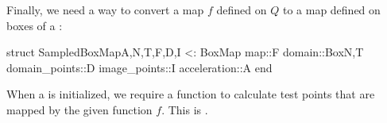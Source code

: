 Finally, we need a way to convert a map
$f$ defined on $Q$ to a map  defined on boxes of a :

\begin{jllisting}[language=julia, style=jlcodestyle]
    struct SampledBoxMap{A,N,T,F,D,I} <: BoxMap
        map::F
        domain::Box{N,T}
        domain_points::D
        image_points::I
        acceleration::A
    end
\end{jllisting}

When a  is initialized, we require a function to calculate test 
points that are mapped by the given function $f$. This is .

\fi

